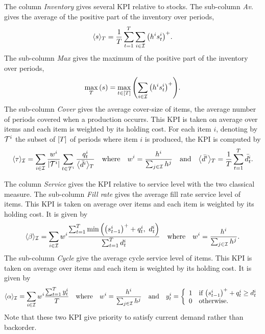 The column \emph{Inventory} gives several KPI relative to stocks.
The sub-column \emph{Av.} gives the average of the positive part of the inventory over periods, \ie
\begin{equation}
  \left<\inventory\right>_{\horizon} = \frac{1}{\horizon}\sum_{t=1}^{\horizon}\sum_{i\in\REF} \bracket{\holding^i\inventory_t^i}^+.
\end{equation}
The sub-column \emph{Max} gives the maximum of the positive part of the inventory over periods, \ie
\begin{equation}
  \max_{\horizon}\bracket{\inventory} = \max_{t\in\range{\horizon}}\bracket{\sum_{i\in\REF} \bracket{\holding^i\inventory_t^i}^+}.
\end{equation}
The sub-column \emph{Cover} gives the average cover-size of items, \ie the average number of periods covered when a production occurrs.
This KPI is taken on average over items and each item is weighted by its holding cost.
For each item $i$, denoting by $\mathcal{T}^i$ the subset of $\range{\horizon}$ of periods where item $i$ is produced, the KPI is computed by
\begin{equation}\label{eq:pdp:numerical-experiments:KPI:cover}
  \left<\cover\right>_{\REF}
  = \sum_{i\in\REF} \frac{w^i}{\card{\cT^i}}\sum_{t\in\cT^i} \frac{\quantity_t^i}{\left<\bar{\demand}^i\right>_{\horizon}}
  \quad\mbox{where}\quad
  w^i=\frac{\holding^i}{\sum_{j\in\REF}\holding^j}
  \quad\mbox{and}\quad
  \left<\bar{\demand}^i\right>_{\horizon}=\frac{1}{\horizon}\sum_{t=1}^{\horizon} \bar{\demand_t^i}.
\end{equation}


The column \emph{Service} gives the KPI relative to service level with the two classical measure.
The sub-column \emph{Fill rate} gives the average fill rate service level of items.
This KPI is taken on average over items and each item is weighted by its holding cost.
It is given by
\begin{equation}\label{eq:pdp:numerical-experiments:KPI:fill-rate-service-level}
  \left<\beta\right>_{\REF} = \sum_{i\in\REF} w^i \frac{\sum_{t=1}^{\horizon}\min\bracket{\bracket{\inventory_{t-1}^i}^++\quantity_t^i,\ \demand_t^i}}{\sum_{t=1}^{\horizon}\demand_t^i}
  \quad\mbox{where}\quad
  w^i=\frac{\holding^i}{\sum_{j\in\REF}\holding^j}.
\end{equation}
The sub-column \emph{Cycle} give the average cycle service level of items.
This KPI is taken on average over items and each item is weighted by its holding cost.
It is given by
\begin{equation}\label{eq:pdp:numerical-experiments:KPI:cycle-service-level}
  \left<\alpha\right>_{\REF} = \sum_{i\in\REF} w^i\frac{\sum_{t=1}^{\horizon} y_t^i}{\horizon}
  \quad\mbox{where}\quad
  w^i=\frac{\holding^i}{\sum_{j\in\REF}\holding^j}
  \quad\mbox{and}\quad
  y_t^i =
  \left\{
  \begin{array}{ll}
  1 & \mbox{if}\ \bracket{\inventory_{t-1}^i}^++\quantity_t^i\ge\demand_t^i \\
  0 & \mbox{otherwise}.
  \end{array}
  \right.
\end{equation}
Note that these two KPI give priority to satisfy current demand rather than backorder.


